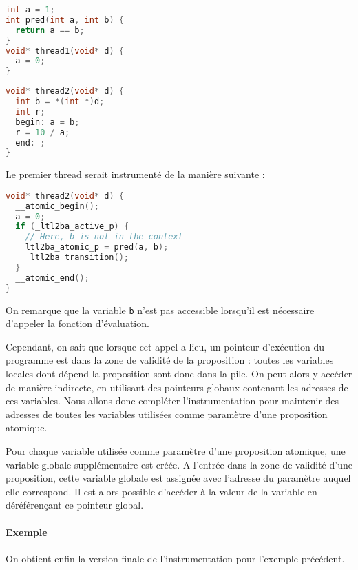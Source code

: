 \noindent\begin{minipage}{.45\textwidth}
\begin{lstlisting}[language=C, frame=single, caption=Thread 1]
int a = 1;
int pred(int a, int b) {
  return a == b;
}
void* thread1(void* d) {
  a = 0;
}
\end{lstlisting}
\end{minipage}\hfill
\begin{minipage}{.45\textwidth}
\begin{lstlisting}[language=C, frame=single, caption=Thread 2]
void* thread2(void* d) {
  int b = *(int *)d;
  int r;
  begin: a = b;
  r = 10 / a;
  end: ;
}
\end{lstlisting}
\end{minipage}

Le premier thread serait instrumenté de la manière suivante :

\begin{lstlisting}[language=C, frame=single, caption=Thread 2 instrumenté]
void* thread2(void* d) {
  __atomic_begin();
  a = 0;
  if (_ltl2ba_active_p) {
    // Here, b is not in the context
    ltl2ba_atomic_p = pred(a, b);
    _ltl2ba_transition();
  }
  __atomic_end();
}
\end{lstlisting}

On remarque que la variable \texttt{b} n'est pas accessible lorsqu'il
est nécessaire d'appeler la fonction d'évaluation.

Cependant, on sait que lorsque cet appel a lieu, un pointeur d'exécution
du programme est dans la zone de validité de la proposition : toutes les
variables locales dont dépend la proposition sont donc dans la pile. On
peut alors y accéder de manière indirecte, en utilisant des pointeurs
globaux contenant les adresses de ces variables. Nous allons donc
compléter l'instrumentation pour maintenir des adresses de toutes les
variables utilisées comme paramètre d'une proposition atomique.

Pour chaque variable utilisée comme paramètre d'une proposition
atomique, une variable globale supplémentaire est créée. A l'entrée dans
la zone de validité d'une proposition, cette variable globale est
assignée avec l'adresse du paramètre auquel elle correspond. Il est
alors possible d'accéder à la valeur de la variable en déréférençant ce
pointeur global.

\paragraph{Exemple}
On obtient enfin la version finale de l'instrumentation pour l'exemple
précédent.

